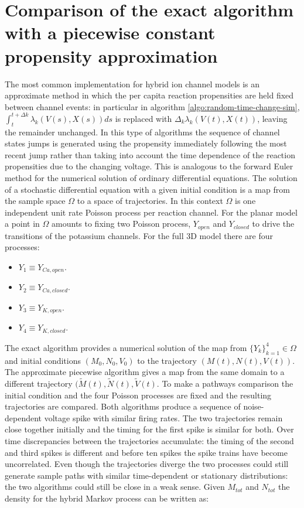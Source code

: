 \section{Comparison of the exact algorithm with a piecewise constant propensity approximation}
The most common implementation for hybrid ion channel models is an approximate method in which the per capita reaction propensities are held fixed between channel events: in particular in algorithm \ref{algo:random-time-change-sim}, $\int_t^{t+\Delta k}\lambda_k(V(s), X(s))ds$ is replaced with $\Delta_k\lambda_k(V(t), X(t))$, leaving the remainder unchanged.
In this type of algorithms the sequence of channel states jumps is generated using the propensity immediately following the most recent jump rather than taking into account the time dependence of the reaction propensities due to the changing voltage.
This is analogous to the forward Euler method for the numerical solution of ordinary differential equations.
The solution of a stochastic differential equation with a given initial condition is a map from the sample space $\Omega$ to a space of trajectories.
In this context $\Omega$ is one independent unit rate Poisson process per reaction channel.
For the planar model a point in $\Omega$ amounts to fixing two Poisson process, $Y_{open}$ and $Y_{closed}$ to drive the transitions of the potassium channels.
For the full 3D model there are four processes:

\begin{multicols}{2}
	\begin{itemize}
		\item $Y_1 \equiv Y_{Ca, open}$.
		\item $Y_2 \equiv Y_{Ca, closed}$.
		\item $Y_3 \equiv Y_{K, open}$.
		\item $Y_4 \equiv Y_{K, closed}$.
	\end{itemize}
\end{multicols}

The exact algorithm provides a numerical solution of the map from $\{Y_k\}_{k=1}^4\in\Omega$ and initial conditions $(M_0, N_0, V_0)$ to the trajectory $(M(t), N(t), V(t))$.
The approximate piecewise algorithm gives a map from the same domain to a different trajectory $(\tilde{M}(t), \tilde{N}(t), \tilde{V}(t)$.
To make a pathways comparison the initial condition and the four Poisson processes are fixed and the resulting trajectories are compared.
Both algorithms produce a sequence of noise-dependent voltage spike with similar firing rates.
The two trajectories remain close together initially and the timing for the first spike is similar for both.
Over time discrepancies between the trajectories accumulate: the timing of the second and third spikes is different and before ten spikes the spike trains have become uncorrelated.
Even though the trajectories diverge the two processes could still generate sample paths with similar time-dependent or stationary distributions: the two algorithms could still be close in a weak sense.
Given $M_{tot}$ and $N_{tot}$ the density for the hybrid Markov process can be written as:

